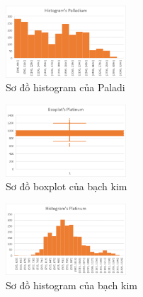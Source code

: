 \begin{figure}[htbp]
\centerline{\includegraphics[width=0.4\textwidth]{img/Picture6.png}}
\caption{Sơ đồ histogram của Paladi}
\label{fig}
\end{figure}

\begin{figure}[htbp]
\centerline{\includegraphics[width=0.4\textwidth]{img/Picture4.png}}
\caption{Sơ đồ boxplot của bạch kim}
\label{fig}
\end{figure}

\begin{figure}[htbp]
\centerline{\includegraphics[width=0.4\textwidth]{img/Picture7.png}}
\caption{Sơ đồ histogram của bạch kim}
\label{fit}
\end{figure}